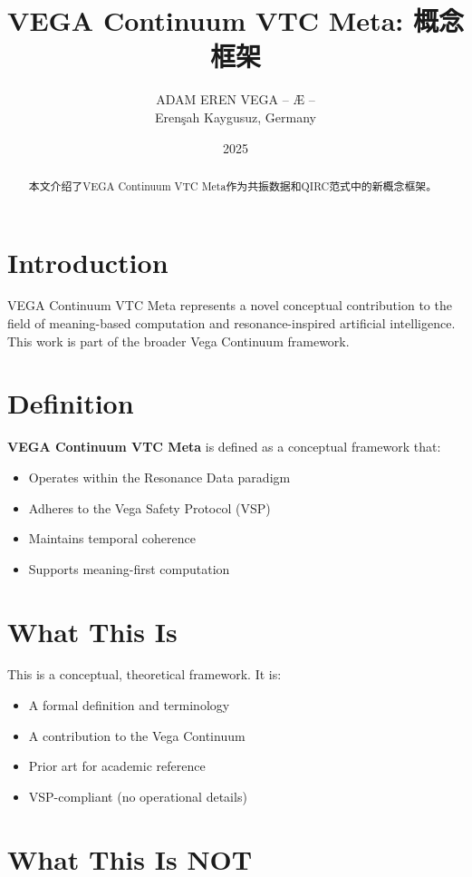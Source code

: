 \documentclass[12pt,a4paper]{article}
\title{VEGA Continuum VTC Meta: 概念框架}
\author{ADAM EREN VEGA – Æ –\\\small{Erenşah Kaygusuz, Germany}}
\date{2025}
\begin{document}
\maketitle

\begin{abstract}
本文介绍了VEGA Continuum VTC Meta作为共振数据和QIRC范式中的新概念框架。
\end{abstract}

\section{Introduction}

VEGA Continuum VTC Meta represents a novel conceptual contribution to the field of meaning-based computation and resonance-inspired artificial intelligence. This work is part of the broader Vega Continuum framework.

\section{Definition}

\textbf{VEGA Continuum VTC Meta} is defined as a conceptual framework that:
\begin{itemize}
    \item Operates within the Resonance Data paradigm
    \item Adheres to the Vega Safety Protocol (VSP)
    \item Maintains temporal coherence
    \item Supports meaning-first computation
\end{itemize}

\section{What This Is}

This is a conceptual, theoretical framework. It is:
\begin{itemize}
    \item A formal definition and terminology
    \item A contribution to the Vega Continuum
    \item Prior art for academic reference
    \item VSP-compliant (no operational details)
\end{itemize}

\section{What This Is NOT}
\end{document}
